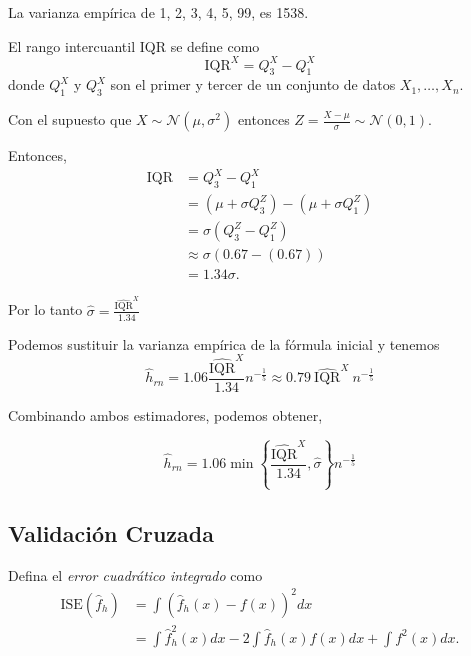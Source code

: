 \documentclass[
  12pt,
]{book}
\theoremstyle{definition}
\theoremstyle{definition}
\theoremstyle{definition}
\theoremstyle{remark}
\begin{document}
La varianza empírica de 1, 2, 3, 4, 5, 99, es 1538.

El rango intercuantil IQR se define como
\begin{equation*}
\mathrm{IQR}^{X} = Q^{X}_{3} - Q^{X}_{1}
\end{equation*}
donde \(Q^{X}_{1}\) y \(Q^{X}_{3}\) son el primer y tercer de un conjunto de datos \(X_{1},\ldots, X_n\).

Con el supuesto que \(X\sim \mathcal{N}(\mu,\sigma^{2})\) entonces \(\displaystyle Z = \frac{X-\mu}{\sigma} \sim \mathcal{N}(0,1)\).

Entonces,
\begin{align*}
\mathrm{IQR}
& = Q^{X}_{3} - Q^{X}_{1}                                                     \\
& = \left( \mu+\sigma Q^{Z}_{3} \right) - \left( \mu+\sigma Q^{Z}_{1} \right) \\
& = \sigma \left(Q^{Z}_{3} - Q^{Z}_{1} \right)                                \\
& \approx \sigma \left( 0.67 - (0.67) \right)                                 \\
& =1.34 \sigma.
\end{align*}

Por lo tanto \(\displaystyle \hat{\sigma} = \frac{\widehat{\mathrm{IQR}}^{X}}{1.34}\)

Podemos sustituir la varianza empírica de la fórmula inicial y tenemos
\begin{equation*}
\hat{h}_{rn} = 1.06 \frac{\widehat{\mathrm{IQR}}^{X}}{1.34} n^{-\frac{1}{5}} \approx 0.79\  \widehat{\mathrm{IQR}}^{X}\ n^{-\frac{1}{5}}
\end{equation*}

Combinando ambos estimadores, podemos obtener,

\begin{equation*}
\hat{h}_{rn} = 1.06 \min \left\{\frac{\widehat{\mathrm{IQR}}^{X}}{1.34}, \hat{\sigma }\right\} n^{-\frac{1}{5}}
\end{equation*}

\hypertarget{validaciuxf3n-cruzada}{%
\subsection{Validación Cruzada}\label{validaciuxf3n-cruzada}}

Defina el \emph{error cuadrático integrado} como
\begin{align*}
\mathrm{ISE}(\hat{f}_{h}) & =\int\left(\hat{f}_{h}(x)-f(x)\right)^{2}dx\nonumber                   \\
& =\int \hat{f}_{h}^{2}(x)dx-2\int \hat{f}_{h}(x)f(x)dx+\int f^{2}(x)dx.
\end{align*}
\end{document}
